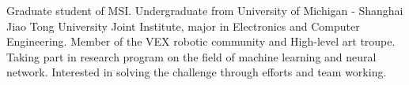 

\begin{cvparagraph}

Graduate student of MSI. Undergraduate from University of Michigan ‑ Shanghai Jiao Tong University Joint Institute, major in Electronics and Computer Engineering. 
Member of the VEX robotic community and High-level art troupe. Taking part in research program on the field of machine learning and neural network. Interested in solving the challenge through efforts and team working.
\end{cvparagraph}
